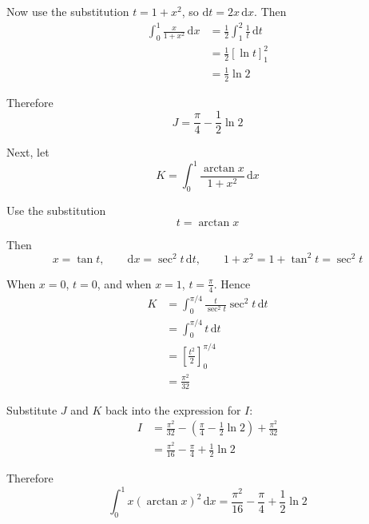 \documentclass[leqno]{article}
\begin{document}
\begin{enumerate}[
  label=\textbf{\arabic*.},
  leftmargin=*,
  topsep=0pt,
  partopsep=0pt,
  parsep=0pt
]
\begin{djsSolution}
\begin{enumerate}[label=\textbf{(\roman*)}]
Now use the substitution \(t=1+x^2\), so \(\mathrm{d}t=2x\,\mathrm{d}x\). Then
\begin{align*}
\int_0^1 \frac{x}{1+x^2}\,\mathrm{d}x
&=\frac{1}{2}\int_1^2 \frac{1}{t}\,\mathrm{d}t\\
&=\frac{1}{2}\left[\ln t\right]_1^2\\
&=\frac{1}{2}\ln 2
\end{align*}

Therefore
\[
J=\frac{\pi}{4}-\frac{1}{2}\ln 2
\]

Next, let
\[
K=\int_0^1 \frac{\arctan x}{1+x^2}\,\mathrm{d}x
\]

Use the substitution
\[
t=\arctan x
\]

Then
\[
x=\tan t,
\qquad
\mathrm{d}x=\sec^2 t\,\mathrm{d}t,
\qquad
1+x^2=1+\tan^2 t=\sec^2 t
\]

When \(x=0\), \(t=0\), and when \(x=1\), \(t=\frac{\pi}{4}\). Hence
\begin{align*}
K
&=\int_0^{\pi/4} \frac{t}{\sec^2 t}\sec^2 t\,\mathrm{d}t\\
&=\int_0^{\pi/4} t\,\mathrm{d}t\\
&=\left[\frac{t^2}{2}\right]_0^{\pi/4}\\
&=\frac{\pi^2}{32}
\end{align*}

Substitute \(J\) and \(K\) back into the expression for \(I\):
\begin{align*}
I
&=\frac{\pi^2}{32}-\left(\frac{\pi}{4}-\frac{1}{2}\ln 2\right)+\frac{\pi^2}{32}\\
&=\frac{\pi^2}{16}-\frac{\pi}{4}+\frac{1}{2}\ln 2
\end{align*}

Therefore
\[
\int_0^1 x(\arctan x)^2\,\mathrm{d}x
=
\frac{\pi^2}{16}-\frac{\pi}{4}+\frac{1}{2}\ln 2
\]
\end{enumerate}
\end{djsSolution}


\end{enumerate}
\end{document}
